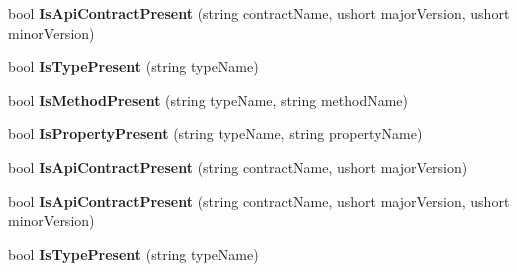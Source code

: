 \begin{DoxyCompactItemize}
bool {\bfseries Is\+Api\+Contract\+Present} (string contract\+Name, ushort major\+Version, ushort minor\+Version)
\item 
\mbox{\label{interface_windows_1_1_foundation_1_1_metadata_1_1_i_api_information_statics_a624a3c7f88248db447de8e71c6d40969}} 
bool {\bfseries Is\+Type\+Present} (string type\+Name)
\item 
\mbox{\label{interface_windows_1_1_foundation_1_1_metadata_1_1_i_api_information_statics_a551de0a63c04169be958fc08bb53e498}} 
bool {\bfseries Is\+Method\+Present} (string type\+Name, string method\+Name)
\item 
\mbox{\label{interface_windows_1_1_foundation_1_1_metadata_1_1_i_api_information_statics_aca08751223a05e1bef2211bddbfc48b3}} 
bool {\bfseries Is\+Property\+Present} (string type\+Name, string property\+Name)
\item 
\mbox{\label{interface_windows_1_1_foundation_1_1_metadata_1_1_i_api_information_statics_a7fca31115e40e05294977921f9cbf369}} 
bool {\bfseries Is\+Api\+Contract\+Present} (string contract\+Name, ushort major\+Version)
\item 
\mbox{\label{interface_windows_1_1_foundation_1_1_metadata_1_1_i_api_information_statics_abd1e942e837a914ecc123132f440c117}} 
bool {\bfseries Is\+Api\+Contract\+Present} (string contract\+Name, ushort major\+Version, ushort minor\+Version)
\item 
\mbox{\label{interface_windows_1_1_foundation_1_1_metadata_1_1_i_api_information_statics_a624a3c7f88248db447de8e71c6d40969}} 
bool {\bfseries Is\+Type\+Present} (string type\+Name)
\item 
\mbox{\label{interface_windows_1_1_foundation_1_1_metadata_1_1_i_api_information_statics_a551de0a63c04169be958fc08bb53e498}} 

\end{DoxyCompactItemize}
